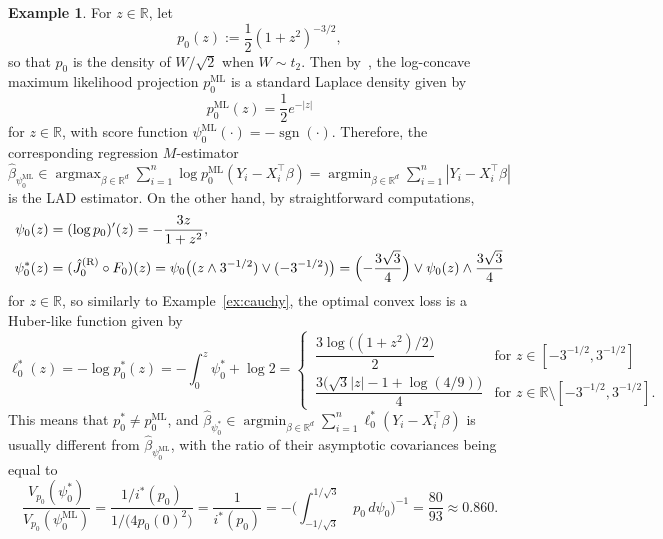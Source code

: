 \documentclass[a4paper]{article}
\newcommand{\R}{\mathbb{R}}
\DeclareMathOperator{\sgn}{sgn}
\DeclareMathOperator*{\argmin}{argmin}
\DeclareMathOperator*{\argmax}{argmax}
\theoremstyle{definition}
\newtheorem{example}[theorem]{Example}
\begin{document}
\begin{example}
\label{ex:t2} 
For $z \in \R$, let
\[
p_0(z) := \frac{1}{2}(1 + z^2)^{-3/2},
\]
so that $p_0$ is the density of $W/\sqrt{2}$ when $W \sim t_2$. Then by~\citet[Example~2.9]{dumbgen2011approximation}, the log-concave maximum likelihood projection $p_0^{\mathrm{ML}}$ is a standard Laplace density given by
\[
p_0^{\mathrm{ML}}(z) = \frac{1}{2}e^{-|z|}
\]
for $z \in \R$, with score function $\psi_0^{\mathrm{ML}}(\cdot) = -\sgn(\cdot)$. Therefore, the corresponding regression $M$-estimator $\hat{\beta}_{\psi_0^{\mathrm{ML}}} \in \argmax_{\beta \in \R^d} \sum_{i=1}^n \log p_0^{\mathrm{ML}}(Y_i - X_i^\top\beta) = \argmin_{\beta \in \R^d} \sum_{i=1}^n |Y_i - X_i^\top\beta|$ is the LAD estimator. On the other hand, by straightforward computations,
\begin{align*}
\psi_0(z) &= (\log p_0)'(z) = -\frac{3z}{1 + z^2}, \\
\psi_0^*(z) &= (\hat{J}_0^{(\mathrm{R})} \circ F_0)(z) = \psi_0\bigl((z \wedge 3^{-1/2}) \vee (-3^{-1/2})\bigr) = \Bigl(-\frac{3\sqrt{3}}{4}\Bigr) \vee \psi_0(z) \wedge \frac{3\sqrt{3}}{4} 
\end{align*}
for $z \in \R$, so similarly to Example~\ref{ex:cauchy}, the optimal convex loss is a Huber-like function given by
\[
\ell_0^*(z) = -\log p_0^*(z) = -\int_0^z \psi_0^* + \log 2 = 
\begin{cases}
\,\dfrac{3\log\bigl((1 + z^2)/2\bigr)}{2} &\text{for }z \in [-3^{-1/2},3^{-1/2}] \\[6pt]
\,\dfrac{3\bigl(\sqrt{3}|z| - 1 + \log(4/9)\bigr)}{4} &\text{for }z \in \R \setminus [-3^{-1/2},3^{-1/2}].
\end{cases}
\]
This means that $p_0^* \neq p_0^{\mathrm{ML}}$, and $\hat{\beta}_{\psi_0^*} \in \argmin_{\beta \in \R^d} \sum_{i=1}^n \ell_0^*(Y_i - X_i^\top\beta)$ is usually different from $\hat{\beta}_{\psi_0^{\mathrm{ML}}}$, with the ratio of their asymptotic covariances being equal to
\[
\frac{V_{p_0}(\psi_0^*)}{V_{p_0}(\psi_0^{\mathrm{ML}})} = \frac{1/i^*(p_0)}{1/\bigl(4p_0(0)^2\bigr)} = \frac{1}{i^*(p_0)} = -\biggl(\int_{-1/\sqrt{3}}^{1/\sqrt{3}}\;p_0\,d\psi_0\biggr)^{-1} = \frac{80}{93} \approx 0.860.
\]
\end{example}
\end{document}
